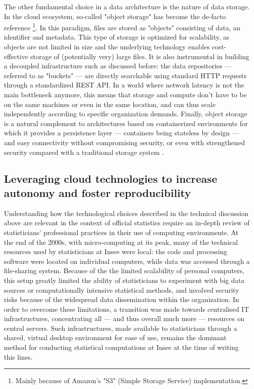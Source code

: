 The other fundamental choice in a data architecture is the nature of data storage. In the cloud ecosystem, so-called "object storage" has become the de-facto reference \cite{samundiswary2017object} \footnote{Mainly because of Amazon's "S3" (Simple Storage Service) implementation.}. In this paradigm, files are stored as "objects" consisting of data, an identifier and metadata. This type of storage is optimized for scalability, as objects are not limited in size and the underlying technology enables cost-effective storage of (potentially very) large files. It is also instrumental in building a decoupled infrastructure such as discussed before: the data repositories — referred to as "buckets" — are directly searchable using standard HTTP requests through a standardized REST API. In a world where network latency is not the main bottleneck anymore, this means that storage and compute don't have to be on the same machines or even in the same location, and can thus scale independently according to specific organization demands. Finally, object storage is a natural complement to architectures based on containerized environments for which it provides a persistence layer — containers being stateless by design — and easy connectivity without compromising security, or even with strengthened security compared with a traditional storage system \cite{mesnier2003object}.

\subsection{Leveraging cloud technologies to increase autonomy and foster reproducibility}

Understanding how the technological choices described in the technical discussion above are relevant in the context of official statistics require an in-depth review of statisticians’ professional practices in their use of computing environments. At the end of the 2000s, with micro-computing at its peak, many of the technical resources used by statisticians at Insee were local: the code and processing software were located on individual computers, while data was accessed through a file-sharing system. Because of the the limited scalability of personal computers, this setup greatly limited the ability of statisticians to experiment with big data sources or computationally intensive statistical methods, and involved security risks because of the widespread data dissemination within the organization. In order to overcome these limitations, a transition was made towards centralised IT infrastructures, concentrating all — and thus overall much more — resources on central servers. Such infrastructures, made available to statisticians through a shared, virtual desktop environment for ease of use, remains the dominant method for conducting statistical computations at Insee at the time of writing this lines.

